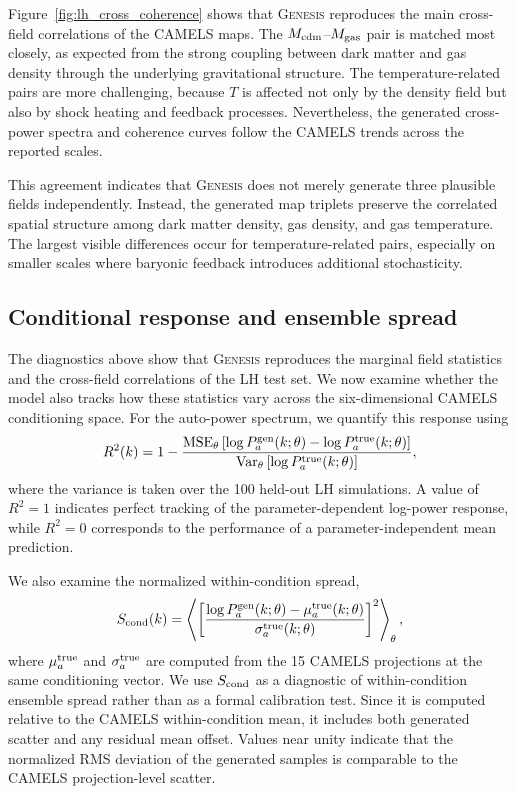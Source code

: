 \documentclass[usenatbib]{mnras}
\newcommand{\Mcdm}{M_{\rm cdm}}
\newcommand{\Mgas}{M_{\rm gas}}
\newcommand{\Tgas}{T}
\begin{document}
Figure~\ref{fig:lh_cross_coherence} shows that \textsc{Genesis}
reproduces the main cross-field correlations of the CAMELS maps. The
$\Mcdm$--$\Mgas$ pair is matched most closely, as expected from the
strong coupling between dark matter and gas density through the
underlying gravitational structure. The temperature-related pairs are
more challenging, because $\Tgas$ is affected not only by the density
field but also by shock heating and feedback processes. Nevertheless,
the generated cross-power spectra and coherence curves follow the
CAMELS trends across the reported scales.

This agreement indicates that \textsc{Genesis} does not merely
generate three plausible fields independently. Instead, the generated
map triplets preserve the correlated spatial structure among dark
matter density, gas density, and gas temperature. The largest visible
differences occur for temperature-related pairs, especially on smaller
scales where baryonic feedback introduces additional stochasticity.

\subsection{Conditional response and ensemble spread}
\label{sec:eval_response}

The diagnostics above show that \textsc{Genesis} reproduces the
marginal field statistics and the cross-field correlations of the LH
test set. We now examine whether the model also tracks how these
statistics vary across the six-dimensional CAMELS conditioning space.
For the auto-power spectrum, we quantify this response using
\begin{equation}
  R^2(k)
  =
  1 -
  \frac{
    {\rm MSE}_{\theta}
    \left[
      \log P_a^{\rm gen}(k;\theta)
      -
      \log P_a^{\rm true}(k;\theta)
    \right]
  }{
    {\rm Var}_{\theta}
    \left[
      \log P_a^{\rm true}(k;\theta)
    \right]
  },
  \label{eq:lh_r2}
\end{equation}
where the variance is taken over the 100 held-out LH simulations.
A value of $R^2=1$ indicates perfect tracking of the
parameter-dependent log-power response, while $R^2=0$ corresponds to
the performance of a parameter-independent mean prediction.

We also examine the normalized within-condition spread,
\begin{equation}
  S_{\rm cond}(k)
  =
  \left\langle
  \left[
  \frac{
    \log P_a^{\rm gen}(k;\theta)
    -
    \mu_a^{\rm true}(k;\theta)
  }{
    \sigma_a^{\rm true}(k;\theta)
  }
  \right]^2
  \right\rangle_{\theta},
  \label{eq:scond}
\end{equation}
where $\mu_a^{\rm true}$ and $\sigma_a^{\rm true}$ are computed from
the 15 CAMELS projections at the same conditioning vector. We use
$S_{\rm cond}$ as a diagnostic of within-condition ensemble spread
rather than as a formal calibration test. Since it is computed relative
to the CAMELS within-condition mean, it includes both generated
scatter and any residual mean offset. Values near unity indicate that
the normalized RMS deviation of the generated samples is comparable
to the CAMELS projection-level scatter.
\end{document}
